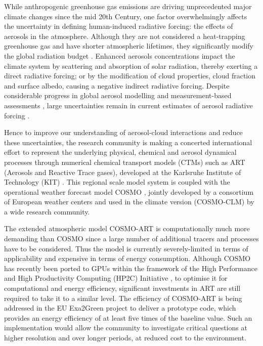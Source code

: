 While anthropogenic greenhouse gas emissions are driving unprecedented
major  climate  changes  since   the  mid  20th  Century,  one  factor
overwhelmingly  affects  the  uncertainty  in  defining  human-induced
radiative  forcing:  the  effects   of  aerosols  in  the  atmosphere.
Although they  are not considered  a heat-trapping greenhouse  gas and
have  shorter  atmospheric lifetimes,  they  significantly modify  the
global   radiation   budget   \citep{IPCC-2013}.   Enhanced   aerosols
concentrations impact the climate  system by scattering and absorption
of solar radiation, thereby exerting a direct radiative forcing; or by
the  modification  of cloud  properties,  cloud  fraction and  surface
albedo,  causing  a  negative  indirect  radiative  forcing.   Despite
considerable  progress in  global aerosol  modelling \citep{Mann-2013}
and    measurement-based    assessments   \citep{Myhre-2009},    large
uncertainties  remain  in   current  estimates  of  aerosol  radiative
forcing   \citep{Myhre-2013,    IPCC-2013,   Lee-2013,   Randles-2013,
Rosenfeld-2013, Sherwood-2013, Stier-2013}.

Hence to  improve our understanding of  aerosol-cloud interactions and
reduce  these  uncertainties,  the  research  community  is  making  a
concerted international  effort to represent  the underlying physical,
chemical  and aerosol dynamical  processes through  numerical chemical
transport  models (CTMs)  such  as ART  (Aerosols  and Reactive  Trace
gases),   developed   at  the   Karlsruhe   Institute  of   Technology
(KIT)  \citep{Vogel-2009,  Bangert-2011,  Knote-2013}.  This  regional
scale model  system is coupled  with the operational  weather forecast
model COSMO \citep{Baldauf-2011}, jointly developed by a consortium of
European weather  centers and used in the  climate version (COSMO-CLM)
by a wide research community.

The extended atmospheric model  COSMO-ART is computationally much more
demanding than  COSMO since a  large number of additional  tracers and
processes  have  to  be  considered.   Thus  the  model  is  currently
severely-limited in  terms of applicability and expensive  in terms of
energy  consumption.   Although  COSMO  has recently  been  ported  to
GPUs  \citep{Gysi-2014, Lapillonne-2014} within  the framework  of the
High    Performance   and    High   Productivity    Computing   (HP2C)
Initiative \citep{HP2C},  to optimise it for  computational and energy
efficiency, significant investments in  ART are still required to take
it to a similar level.  The efficiency of COSMO-ART is being addressed
in the  EU Exa2Green project \citep{EXA2GREEN} to  deliver a prototype
code, which  provides an energy efficiency  of at least  five times of
the baseline value.  Such  an implementation would allow the community
to investigate critical questions at higher resolution and over longer
periods, at reduced cost to the environment.

